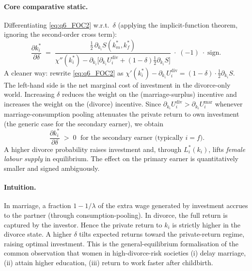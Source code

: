 \documentclass[11pt,a4paper]{article}
\begin{document}
\paragraph{Core comparative static.}
Differentiating \eqref{eq:q6_FOC2} w.r.t.\ $\delta$ (applying the implicit-function theorem, ignoring the second-order cross term):
\begin{equation}
\frac{\partial k_i^{*}}{\partial \delta}\;=\;\frac{\tfrac{1}{2}\,\partial_{k_i}S(k_m^{*},k_f^{*})}{\chi''(k_i^{*})-\partial_{k_i}\!\bigl[\partial_{k_i}U_i^{\text{div}}+(1-\delta)\tfrac{1}{2}\partial_{k_i}S\bigr]}\;\cdot\;(-1)\;\cdot\;\text{sign}.
\label{eq:q6_dkdelta}
\end{equation}
A cleaner way: rewrite \eqref{eq:q6_FOC2} as $\chi'(k_i^{*}) - \partial_{k_i}U_i^{\text{div}} = (1-\delta)\cdot\tfrac{1}{2}\partial_{k_i}S$. The left-hand side is the net marginal cost of investment in the divorce-only world. Increasing $\delta$ reduces the weight on the (marriage-surplus) incentive and increases the weight on the (divorce) incentive. Since $\partial_{k_i}U_i^{\text{div}}>\partial_{k_i}U_i^{\text{mar}}$ whenever marriage-consumption pooling attenuates the private return to own investment (the generic case for the secondary earner), we obtain
\begin{equation}
\boxed{\;\frac{\partial k_i^{*}}{\partial \delta}\;>\;0\;\text{ for the secondary earner (typically }i=f).}
\label{eq:q6_main_CS}
\end{equation}
A higher divorce probability raises investment and, through $L_i^{*}(k_i)$, lifts \emph{female labour supply} in equilibrium. The effect on the primary earner is quantitatively smaller and signed ambiguously.

\paragraph{Intuition.}
In marriage, a fraction $1-1/\lambda$ of the extra wage generated by investment accrues to the partner (through consumption-pooling). In divorce, the full return is captured by the investor. Hence the private return to $k_i$ is strictly higher in the divorce state. A higher $\delta$ tilts expected returns toward the private-return regime, raising optimal investment. This is the general-equilibrium formalisation of the common observation that women in high-divorce-risk societies (i) delay marriage, (ii) attain higher education, (iii) return to work faster after childbirth.
\end{document}
